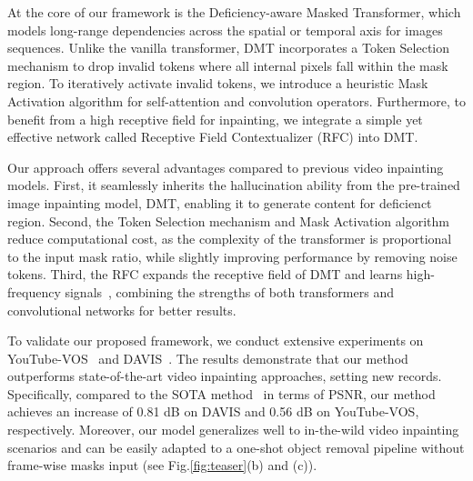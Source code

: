 \documentclass[10pt,twocolumn,letterpaper]{article}
\begin{document}
At the core of our framework is the Deficiency-aware Masked Transformer, which models long-range dependencies across the spatial or temporal axis for images sequences. Unlike the vanilla transformer, DMT incorporates a Token Selection mechanism to drop invalid tokens where all internal pixels fall within the mask region. To iteratively activate invalid tokens, we introduce a heuristic Mask Activation algorithm for self-attention and convolution operators. Furthermore, to benefit from a high receptive field for inpainting, we integrate a simple yet effective network called Receptive Field Contextualizer (RFC) into DMT.

Our approach offers several advantages compared to previous video inpainting models. First, it seamlessly inherits the hallucination ability from the pre-trained image inpainting model, DMT, enabling it to generate content for deficienct region. Second, the Token Selection mechanism and Mask Activation algorithm reduce computational cost, as the complexity of the transformer is proportional to the input mask ratio, while slightly improving performance by removing noise tokens. Third, the RFC expands the receptive field of DMT and learns high-frequency signals~\cite{park22how}, combining the strengths of both transformers and convolutional networks for better results.

To validate our proposed framework, we conduct extensive experiments on YouTube-VOS~\cite{youtubevos} and DAVIS~\cite{davis}. The results demonstrate that our method outperforms state-of-the-art video inpainting approaches, setting new records. Specifically, compared to the SOTA method~\cite{li22e2fgvi} in terms of PSNR, our method achieves an increase of 0.81 dB on DAVIS and 0.56 dB on YouTube-VOS, respectively. Moreover, our model generalizes well to in-the-wild video inpainting scenarios and can be easily adapted to a one-shot object removal pipeline without frame-wise masks input (see Fig.\ref{fig:teaser}(b) and (c)). 
\end{document}
